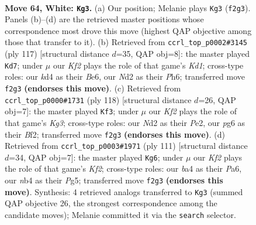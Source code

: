 \documentclass[11pt]{article}
\begin{document}
\clearpage

\begin{figure}[p]\centering
\begin{subfigure}{0.46\textwidth}\centering
\resizebox{\linewidth}{!}{%
\newchessgame
\chessboard[
  setfen={8/2r2p1p/6p1/4P3/bn1k1Pp1/8/3N1K1P/1B6 w - - 18 64},
  showmover=false,
  pgfstyle=straightmove, color=movearrow, markmove={f2-g3}
]}
\caption{}
\end{subfigure}\hfill
\begin{subfigure}{0.46\textwidth}\centering
\resizebox{\linewidth}{!}{%
\newchessgame
\chessboard[
  setfen={3k4/8/3Pbp1p/4p3/1p4PK/3B3P/1P6/8 b - - 4 59},
  showmover=false,
  pgfstyle=straightmove, color=movearrow, markmove={d8-d7}
]}
\caption{}
\end{subfigure}
\\[4pt]
\begin{subfigure}{0.46\textwidth}\centering
\resizebox{\linewidth}{!}{%
\newchessgame
\chessboard[
  setfen={2n2k2/5p2/1p4p1/3Bp1P1/bP6/3P2K1/4PB2/8 w - - 3 60},
  showmover=false,
  pgfstyle=straightmove, color=movearrow, markmove={g3-f3}
]}
\caption{}
\end{subfigure}\hfill
\begin{subfigure}{0.46\textwidth}\centering
\resizebox{\linewidth}{!}{%
\newchessgame
\chessboard[
  setfen={8/5k1p/p7/3p2p1/3B2P1/P1P2P2/6K1/3b4 b - - 11 56},
  showmover=false,
  pgfstyle=straightmove, color=movearrow, markmove={f7-g6}
]}
\caption{}
\end{subfigure}
\caption{\textbf{Move 64, White: \texttt{Kg3}.} (a) Our position; Melanie plays \texttt{Kg3} (\texttt{f2g3}). Panels (b)--(d) are the retrieved master positions whose correspondence most drove this move (highest QAP objective among those that transfer to it). (b) Retrieved from \texttt{ccrl\_top\_p0002\#3145} (ply 117) [structural distance $d$=35, QAP obj=8]: the master played \texttt{Kd7}; under $\mu$ our \emph{Kf2} plays the role of that game's \emph{Kd1}; cross-type roles: our \emph{k}d4 as their \emph{B}e6, our \emph{N}d2 as their \emph{P}h6; transferred move \texttt{f2g3} \textbf{(endorses this move)}. (c) Retrieved from \texttt{ccrl\_top\_p0000\#1731} (ply 118) [structural distance $d$=26, QAP obj=7]: the master played \texttt{Kf3}; under $\mu$ our \emph{Kf2} plays the role of that game's \emph{Kg3}; cross-type roles: our \emph{N}d2 as their \emph{P}e2, our \emph{p}g6 as their \emph{B}f2; transferred move \texttt{f2g3} \textbf{(endorses this move)}. (d) Retrieved from \texttt{ccrl\_top\_p0003\#1971} (ply 111) [structural distance $d$=34, QAP obj=7]: the master played \texttt{Kg6}; under $\mu$ our \emph{Kf2} plays the role of that game's \emph{Kf2}; cross-type roles: our \emph{b}a4 as their \emph{P}a6, our \emph{n}b4 as their \emph{P}g5; transferred move \texttt{f2g3} \textbf{(endorses this move)}. Synthesis: 4 retrieved analogs transferred to \texttt{Kg3} (summed QAP objective 26, the strongest correspondence among the candidate moves); Melanie committed it via the \texttt{search} selector.}
\label{fig:thought-m126}
\end{figure}
\end{document}
